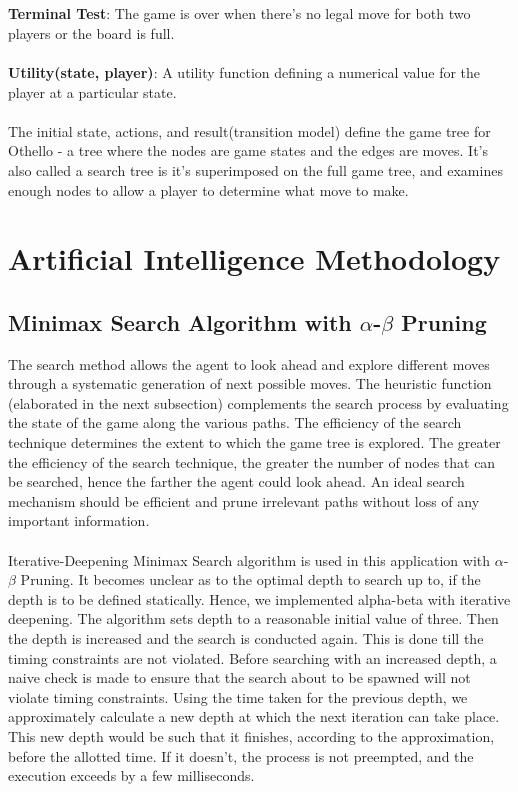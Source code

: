 \documentclass[letterpaper,12pt]{article}
\begin{document}
\\\\
\textbf{Terminal Test}: The game is over when there's no legal move for both two players or the board is full.
\\\\
\textbf{Utility(state, player)}: A utility function defining a numerical value for the player at a particular state.
\\\\
The initial state, actions, and result(transition model) define the game tree for Othello - a tree where the nodes are game states and the edges are moves. It's also called a search tree is it's superimposed on the full game tree, and examines enough nodes to allow a player to determine what move to make.


\section{Artificial Intelligence Methodology}

\subsection{Minimax Search Algorithm with $\alpha$-$\beta$ Pruning}

The search method allows the agent to look ahead and explore different moves through a systematic generation of next possible moves. The heuristic function (elaborated in the next subsection) complements the search process by evaluating the state of the game along the various paths. The efficiency of the search technique determines the extent to which the game tree is explored. The greater the efficiency of the search technique, the greater the number of nodes that can be searched, hence the farther the agent could look ahead. An ideal search mechanism should be efficient and prune irrelevant paths without loss of any important information.\\\\
\noindent
Iterative-Deepening Minimax Search algorithm is used in this application with $\alpha$-$\beta$ Pruning. It becomes unclear as to the optimal depth to search up to, if the depth is to be defined
statically. Hence, we implemented alpha-beta with iterative deepening. The algorithm sets depth to a reasonable initial value of three. Then the depth is increased and the search is conducted
again. This is done till the timing constraints are not violated. Before searching with an increased depth, a naive check is made to ensure that the search about to be spawned will not violate timing constraints. Using the time taken for the previous depth, we approximately calculate a new depth at which the next iteration can take place. This new depth would be such that it finishes, according to the approximation, before the allotted time. If it doesn’t, the process is not preempted, and the execution exceeds by a few milliseconds. 
\end{document}
